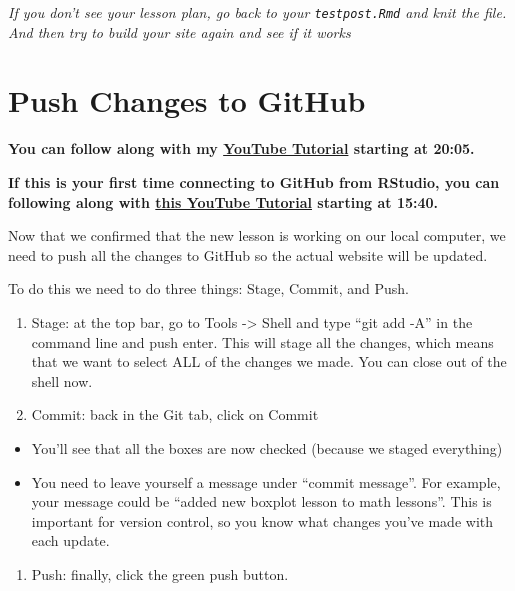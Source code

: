 \documentclass[
]{article}
\providecommand{\tightlist}{%
  \setlength{\itemsep}{0pt}\setlength{\parskip}{0pt}}
\begin{document}
\emph{If you don't see your lesson plan, go back to your
\texttt{testpost.Rmd} and knit the file. And then try to build your site
again and see if it works}

\hypertarget{push-changes-to-github}{%
\section{Push Changes to GitHub}\label{push-changes-to-github}}

\textbf{You can follow along with my
\href{https://www.youtube.com/watch?v=b7TLIX6z1JQ}{YouTube Tutorial}
starting at 20:05.}

\textbf{If this is your first time connecting to GitHub from RStudio,
you can following along with
\href{https://www.youtube.com/watch?v=NLU05CopNzU}{this YouTube
Tutorial} starting at 15:40.}

Now that we confirmed that the new lesson is working on our local
computer, we need to push all the changes to GitHub so the actual
website will be updated.

To do this we need to do three things: Stage, Commit, and Push.

\begin{enumerate}
\def\labelenumi{\arabic{enumi}.}
\item
  Stage: at the top bar, go to Tools -\textgreater{} Shell and type
  ``git add -A'' in the command line and push enter. This will stage all
  the changes, which means that we want to select ALL of the changes we
  made. You can close out of the shell now.
\item
  Commit: back in the Git tab, click on Commit
\end{enumerate}

\begin{itemize}
\tightlist
\item
  You'll see that all the boxes are now checked (because we staged
  everything)
\item
  You need to leave yourself a message under ``commit message''. For
  example, your message could be ``added new boxplot lesson to math
  lessons''. This is important for version control, so you know what
  changes you've made with each update.
\end{itemize}

\begin{enumerate}
\def\labelenumi{\arabic{enumi}.}
\setcounter{enumi}{2}
\tightlist
\item
  Push: finally, click the green push button.
\end{enumerate}
\end{document}
